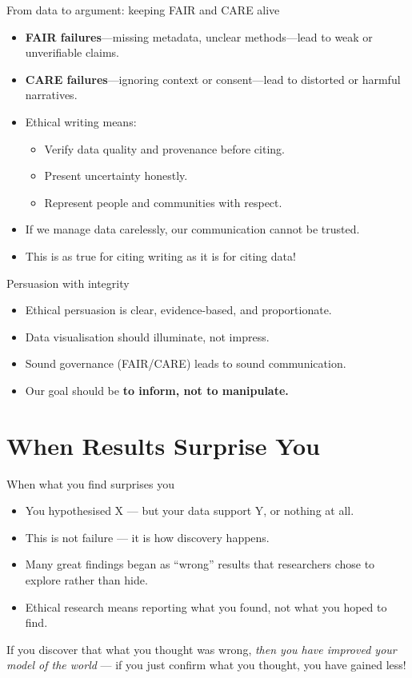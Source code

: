 \documentclass[aspectratio=169]{beamer}
\begin{document}
\begin{frame}{From data to argument: keeping FAIR and CARE alive}
\begin{itemize}
  \item \textbf{FAIR failures}—missing metadata, unclear methods—lead to weak or unverifiable claims.  
  \item \textbf{CARE failures}—ignoring context or consent—lead to distorted or harmful narratives.  
  \item Ethical writing means:
    \begin{itemize}
      \item Verify data quality and provenance before citing.  
      \item Present uncertainty honestly.  
      \item Represent people and communities with respect.
    \end{itemize}
  \item If we manage data carelessly, our communication cannot be trusted.
  \item This is as true for citing writing as it is for citing data!
\end{itemize}

\end{frame}

\begin{frame}{Persuasion with integrity}
\begin{itemize}
  \item Ethical persuasion is clear, evidence-based, and proportionate.  
  \item Data visualisation should illuminate, not impress.  
  \item Sound governance (FAIR/CARE) leads to sound communication.  
  \item Our goal should be \textbf{to inform, not to manipulate.}
\end{itemize}
\end{frame}

\section{When Results Surprise You}

\begin{frame}{When what you find  surprises you}
\begin{itemize}
  \item You hypothesised X — but your data support Y, or nothing at all.  
  \item This is not failure — it is how discovery happens.  
  \item Many great findings began as “wrong” results that researchers chose to explore rather than hide.  
  \item Ethical research means reporting what you found, not what you hoped to find.
\end{itemize}
If you discover that what you thought was wrong, \emph{then you have improved your model of the world} --- if you just confirm what you thought, you have gained less!
\end{frame}
\end{document}
